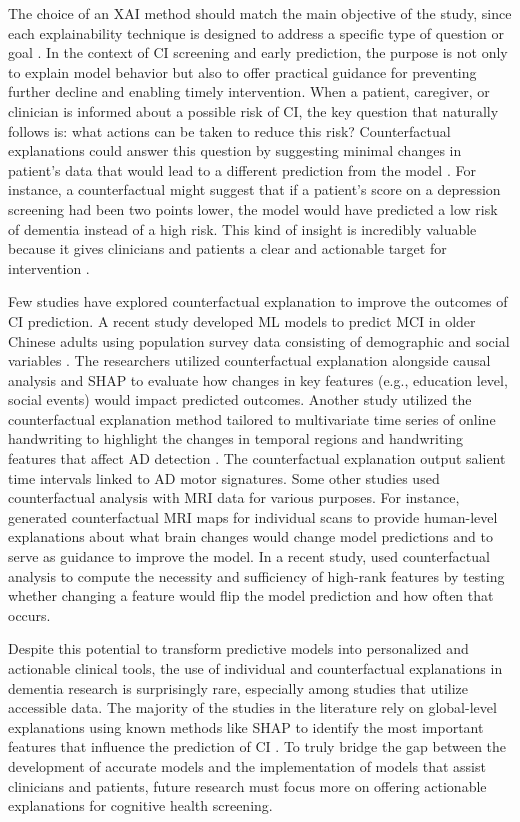 The choice of an XAI method should match the main objective of the study, since each explainability technique is designed to address a specific type of question or goal \cite{Martin2023Interpretable}. In the context of CI screening and early prediction, the purpose is not only to explain model behavior but also to offer practical guidance for preventing further decline and enabling timely intervention. When a patient, caregiver, or clinician is informed about a possible risk of CI, the key question that naturally follows is: what actions can be taken to reduce this risk? Counterfactual explanations could answer this question by suggesting minimal changes in patient's data that would lead to a different prediction from the model \cite{Wachter2017Counterfactual}. For instance, a counterfactual might suggest that if a patient’s score on a depression screening had been two points lower, the model would have predicted a low risk of dementia instead of a high risk. This kind of insight is incredibly valuable because it gives clinicians and patients a clear and actionable target for intervention \cite{Martin2023Interpretable}.

Few studies have explored counterfactual explanation to improve the outcomes of CI prediction. A recent study developed ML models to predict MCI in older Chinese adults using population survey data consisting of demographic and social variables \cite{Song2025Machine}. The researchers utilized counterfactual explanation alongside causal analysis and SHAP to evaluate how changes in key features (e.g., education level, social events) would impact predicted outcomes. Another study utilized the counterfactual explanation method tailored to multivariate time series of online handwriting to highlight the changes in temporal regions and handwriting features that affect AD detection \cite{Sweidan2024Explainability}. The counterfactual explanation output salient time intervals linked to AD motor signatures. Some other studies used counterfactual analysis with MRI data for various purposes. For instance,  generated counterfactual MRI maps for individual scans to provide human-level explanations about what brain changes would change model predictions and to serve as guidance to improve the model. In a recent study,  used counterfactual analysis to compute the necessity and sufficiency of high-rank features by testing whether changing a feature would flip the model prediction and how often that occurs.

Despite this potential to transform predictive models into personalized and actionable clinical tools, the use of individual and counterfactual explanations in dementia research is surprisingly rare, especially among studies that utilize accessible data. The majority of the studies in the literature rely on global-level explanations using known methods like SHAP to identify the most important features that influence the prediction of CI \cite{Viswan2024Explainable}. To truly bridge the gap between the development of accurate models and the implementation of models that assist clinicians and patients, future research must focus more on offering actionable explanations for cognitive health screening.

